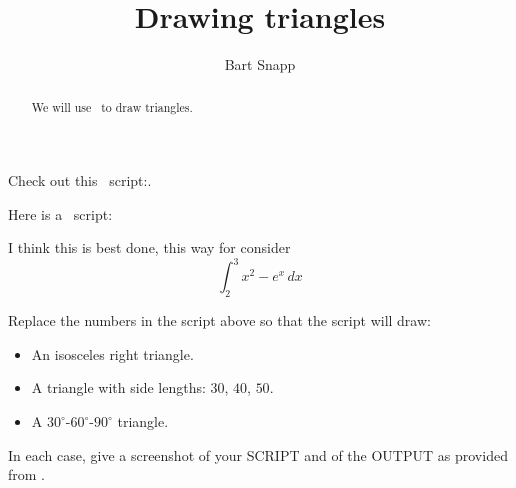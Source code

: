 \documentclass{ximera}
\title{Drawing triangles}
\author{Bart Snapp}
\begin{document}
\begin{abstract}
  We will use \snap\ to draw triangles.
\end{abstract}
\maketitle

\begin{question}
  Check out this \snap\ script:.
  \begin{scratch}[num blocks,scale=.8]
  \end{scratch}
\end{question}


\begin{question}
  Here is a \snap\ script:

      \begin{scratch}[num blocks,scale=.8]
    \end{scratch}
  
\begin{freeResponse}
  I think this is best done, this way for consider
  \[
  \int_2^3 x^2-e^x \, d x
  \]
\end{freeResponse}
\end{question}


\begin{question}
 Replace the numbers in the script above so that the script will draw:
 \begin{itemize}
 \item An isosceles right triangle.
 \item A triangle with side lengths: $30$, $40$, $50$.
 \item A $30^\circ$-$60^\circ$-$90^\circ$ triangle.
 \end{itemize}

 In each case, give a screenshot of your SCRIPT and of the OUTPUT as provided from \snap.
\end{question}
\end{document}
